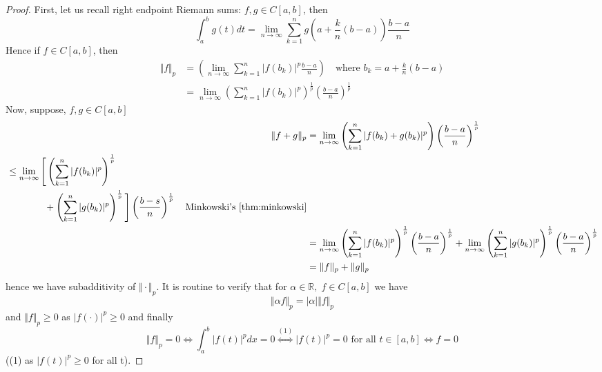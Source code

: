 \documentclass[11pt, oneside]{book}
\theoremstyle{break}
\newtheorem*{proof}{Proof}
\newcommand{\bb}[1]{\mathbb{#1}}			%
\begin{document}
\begin{proof}
	First, let us recall right endpoint Riemann sums: $f, g \in C[a,b]$, then
	\begin{equation}
		\int_{a}^{b} g(t) dt = \lim_{n \to \infty} \sum_{k=1}^{n} g \left(a + \frac{k}{n} (b - a) \right)\frac{b-a}{n}
	\end{equation}
	Hence if $f \in C[a,b]$, then
	\begin{align*}
		\Vert f\Vert _p &= \left( \lim_{n \to \infty} \sum_{k=1}^{n} |f(b_k)|^p \frac{b-a}{n}  \right) \quad \text{where } b_k = a + \frac{k}{n} (b - a) \\
			&= \lim_{n \to \infty} \left(\sum_{k=1}^{n} |f(b_k)|^p \right)^{\frac{1}{p}} \left( \frac{b-a}{n} \right)^{\frac{1}{p}}
	\end{align*}
	Now, suppose, $f, g \in C[a,b]$
	\begin{align*}
		\Vert f + g\Vert _p &= \lim_{n \to \infty} \left( \sum_{k=1}^{n} |f(b_k) + g(b_k)|^p \right) \left(\frac{b-a}{n} \right)^{\frac{1}{p}} \\
			\begin{split}
				&\leq \lim_{n \to \infty} \Bigg[ \left(\sum_{k=1}^{n} |f(b_k)|^p \right)^{\frac{1}{p}} \\ 
				&\qquad\qquad + \left(\sum_{k=1}^{n} |g(b_k)|^p \right)^{\frac{1}{p}} \Bigg] \left( \frac{b-s}{n} \right)^{\frac{1}{p}} \quad \text{Minkowski's } \autoref{thm:minkowski}
			\end{split} \\
			&= \lim_{n \to \infty} \left(\sum_{k=1}^{n} |f(b_k)|^p \right)^{\frac{1}{p}} \left( \frac{b-a}{n} \right)^{\frac{1}{p}} + \lim_{n \to \infty} \left(\sum_{k=1}^{n} |g(b_k)|^p \right)^{\frac{1}{p}} \left( \frac{b-a}{n} \right)^{\frac{1}{p}} \\
			&= \Vert f\Vert _p + \Vert g\Vert _p
	\end{align*}
	hence we have subadditivity of $\Vert \cdot\Vert _p$. It is routine to verify that for $\alpha \in \bb{R}, \; f \in C[a,b]$ we have
	\begin{equation}
		\Vert \alpha f \Vert_p = |\alpha|\Vert f\Vert _p
	\end{equation}
	and $\Vert f\Vert _p \geq 0$ as $|f(\cdot)|^p \geq 0$ and finally
	\begin{equation}
		\Vert f\Vert _p = 0 \iff \int_{a}^{b} |f(t)|^p dx = 0 \overset{(1)}{\iff} |f(t)|^p = 0 \text{ for all } t \in [a,b] \iff f = 0
	\end{equation}
	((1) as $|f(t)|^p \geq 0$ for all t).
\end{proof}
\end{document}
